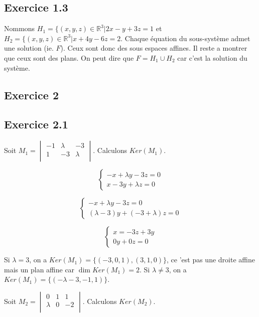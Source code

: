 \documentclass[]{book}
\theoremstyle{definition}
\newcommand{\bb}[1]{\mathbb{#1}}
\newcommand{\R}{\bb{R}}
\begin{document}
\subsection*{Exercice 1.3}
Nommons $H_1 = \{ (x,y,z) \in \R^3 | 2x-y+3z = 1$ et  $H_2 = \{ (x,y,z) \in \R^3 | x+4y-6z = 2$. Chaque \'equation du sous-syst\`eme admet une solution (ie. $F$). Ceux sont donc des sous espaces affines. 
Il reste a montrer que ceux sont des plans. On peut dire que $F = H_1 \cup H_2$ car c'est la solution du syst\`eme.


\subsection*{Exercice 2}
\subsection*{Exercice 2.1}
Soit $M_1=\begin{vmatrix}
    -1 & \lambda & -3 \\
    1 & -3 & \lambda \\
\end{vmatrix}$. Calculons $Ker(M_1)$.

$$
\left\{ 
    \begin{array}{l}
        -x + \lambda y - 3 z = 0 \\
        x - 3 y + \lambda z = 0
    \end{array}
\right.
$$

$$
\left\{ 
    \begin{array}{l}
        -x + \lambda y - 3 z = 0 \\
        (\lambda - 3) y + (-3 +\lambda) z = 0
    \end{array}
\right.
$$

$$
\left\{ 
    \begin{array}{l}
        x  = -3z+3y \\
        0y + 0z= 0
    \end{array}
\right.
$$

Si $\lambda = 3$, on a $Ker(M_1) = \{(-3, 0, 1), (3, 1, 0)\}$, ce 'est pas une droite affine mais un plan affine car $\dim Ker(M_1) = 2$. Si $\lambda \neq 3$, on a $Ker(M_1) = \{(-\lambda -3, -1, 1)\}$. 

Soit $M_2=\begin{vmatrix}
    0 & 1 & 1 \\
    \lambda & 0 & -2 \\
\end{vmatrix}$. Calculons $Ker(M_2)$.
\end{document}
